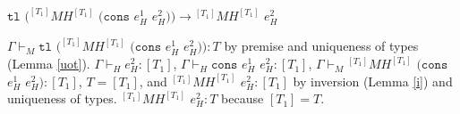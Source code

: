 \begin{case}
$\mathtt{tl}$ $(^{[T_{1}]}MH^{[T_{1}]}$ $(\mathtt{cons}$ $e_{H}^{1}$ $e_{H}^{2}))\rightarrow{^{[T_{1}]}M}H^{[T_{1}]}$ $e_{H}^{2}$

$\Gamma\vdash_{M}\mathtt{tl}$ $(^{[T_{1}]}MH^{[T_{1}]}$ $(\mathtt{cons}$ $e_{H}^{1}$ $e_{H}^{2})):T$ by premise and uniqueness of types (Lemma \ref{uot}).  $\Gamma\vdash_{H}e_{H}^{2}:[T_{1}]$, $\Gamma\vdash_{H}\mathtt{cons}$ $e_{H}^{1}$ $e_{H}^{2}:[T_{1}]$, $\Gamma\vdash_{M}{^{[T_{1}]}M}H^{[T_{1}]}$ $(\mathtt{cons}$ $e_{H}^{1}$ $e_{H}^{2}):[T_{1}]$, $T=[T_{1}]$, and $^{[T_{1}]}MH^{[T_{1}]}$ $e_{H}^{2}:[T_{1}]$ by inversion (Lemma \ref{i}) and uniqueness of types.  $^{[T_{1}]}MH^{[T_{1}]}$ $e_{H}^{2}:T$ because $[T_{1}]=T$.
\end{case}